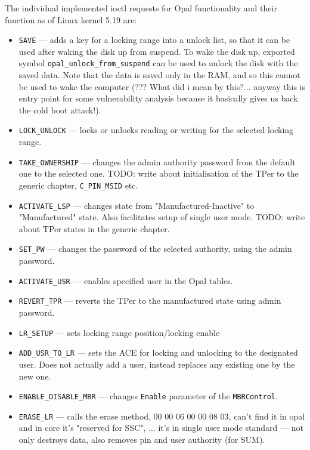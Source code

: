The individual implemented ioctl requests for Opal functionality and their function as of Linux kernel 5.19 are:
\begin{itemize}
\item \verb|SAVE| --- adds a key for a locking range into a unlock list, so that it can be used after waking the disk up from suspend. To wake the disk up, exported symbol \verb|opal_unlock_from_suspend| can be used to unlock the disk with the saved data. Note that the data is saved only in the RAM, and so this cannot be used to wake the computer (??? What did i mean by this?... anyway this is entry point for some vulnerability analysis because it basically gives us back the cold boot attack!).
\item \verb|LOCK_UNLOCK| --- locks or unlocks reading or writing for the selected locking range.
\item \verb|TAKE_OWNERSHIP| --- changes the admin authority password from the default one to the selected one. TODO: write about initialisation of the TPer to the generic chapter, \verb|C_PIN_MSID| etc.
\item \verb|ACTIVATE_LSP| --- changes state from "Manufactured-Inactive" to "Manufactured" state. Also facilitates setup of single user mode. TODO: write about TPer states in the generic chapter. 
\item \verb|SET_PW| --- changes the password of the selected authority, using the admin password.
\item \verb|ACTIVATE_USR| --- enables specified user in the Opal tables.
\item \verb|REVERT_TPR| --- reverts the TPer to the manufactured state using admin password.
\item \verb|LR_SETUP| --- sets locking range position/locking enable
\item \verb|ADD_USR_TO_LR| --- sets the ACE for locking and unlocking to the designated user. Does not actually add a user, instead replaces any existing one by the new one. %
\item \verb|ENABLE_DISABLE_MBR| --- changes \verb|Enable| parameter of the \verb|MBRControl|. %
\item \verb|ERASE_LR| --- calls the erase method, 00 00 06 00 00 08 03, can't find it in opal and in core it's "reserved for SSC", ... it's in single user mode standard --- not only destroys data, also removes pin and user authority (for SUM).

\end{itemize}
